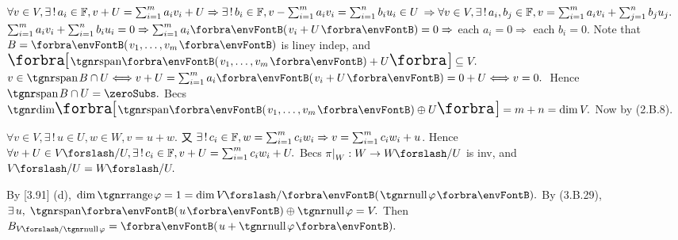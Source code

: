 $\forall v\in V,\exists\,!\,a_i\in{\mathbb{F}},v+U=\sum_{i=1}^m a_i v_i+U\Rightarrow\exists\,!\,b_i\in{\mathbb{F}},v-\sum_{i=1}^m a_i v_i=\sum_{i=1}^n b_i u_i\in U$\parSol{\vspace{2pt}}
$\Rightarrow \forall v\in V,\exists\,!\,a_i,b_j\in{\mathbb{F}},v=\sum_{i=1}^m a_i v_i+\sum_{j=1}^n b_j u_j.$\PfEnd\parSol{\vspace{6pt}}
\Or $\sum_{i=1}^m a_i v_i+\sum_{i=1}^n b_i u_i=0\Rightarrow\sum_{i=1}^m a_i\Par{v_i+U}=0\Rightarrow$ each $a_i=0\Rightarrow$ each $b_i=0.$\PfEnd\parSol{\vspace{6pt}}
\Or Note that $B=\Par{v_1,\dots,v_m}$ is liney indep, and $\Sbra{\Span{v_1,\dots,v_m}+U}\subseteq V.$\parSol{}
$v\in\spn B\cap U\Longleftrightarrow v+U=\sum_{i=1}^ma_i\Par{v_i+U}=0+U\Longleftrightarrow v=0.$ \,Hence $\spn B\cap U=\zeroSubs.$\parSol{}
Becs $\Dim\Sbra{\Span{v_1,\dots,v_m}\oplus U}=m+n=\dim V.$ \;Now by (2.B.8).\PfEnd
\SepLine

$\forall v\in V,\exists\,!\,u\in U,w\in W,v=u+w.$ 又 $\exists\,!\,c_i\in{\mathbb{F}},w=\sum_{i=1}^m c_i w_i\Rightarrow v=\sum_{i=1}^m c_i w_i+u$.\parSol{}
Hence $\forall v+U\in V\XSlash U,\exists\,!\,c_i\in\Fbb,v+U=\sum_{i=1}^m c_i w_i+U.$\PfEnd\vspace{2pt}\parSol{}
\Or Becs $\pi\mmid_W:W\rightarrow W\XSlash U$ is inv, and $V\XSlash U=W\XSlash U.$\PfEnd
\SepLine

\def\Pure{{\textup{\tgnr Pure}}\,}


By [3.91] (d), $\dim\range\varphi=1=\dim V\XSlash \Par{\null \varphi}.$\parSol{}
\Or By ({3.B.29}), $\exists\,u,\;\Span{u}\oplus\null\varphi=V.$ Then $B_{V\XSlash \null\varphi}=\Par{u+\null\varphi}.$\PfEnd\vspace{-2pt}
\SepLine

